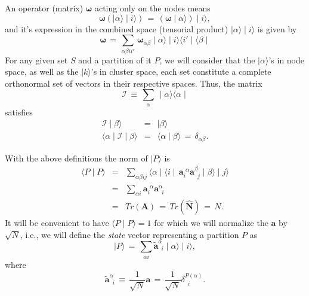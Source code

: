 \documentclass[twocolumn,aps,sort,nofootinbib]{revtex4}
\begin{document}
An operator (matrix) $\boldsymbol{\omega}$ acting only on the  nodes means
\begin{equation}
\boldsymbol{\omega}\left(\mid\alpha\rangle\mid i\rangle\right)\,=\,
\left(\boldsymbol{\omega}\mid\alpha\rangle\right)\mid i\rangle,
\end{equation}
and it's expression in the combined space (tensorial product) $\mid\alpha\rangle\mid i\rangle$
is given by
\begin{equation}
\boldsymbol{\omega}\,=\,\sum_{\alpha\beta ii'}\,\boldsymbol{\omega}_{\alpha\beta}\mid\alpha\rangle\mid i\rangle
\langle i'\mid\langle\beta\mid
\label{Operator}
\end{equation}
For any given set $S$ and a partition of it $P$, we will
consider that the $\mid\alpha\rangle$'s in node space, as well
as the $\mid k\rangle$'s in cluster space, each set constitute
a complete orthonormal set of vectors in their respective spaces.
Thus, the matrix
\begin{equation}
\mathcal{I}\,\equiv\,\sum_\alpha\,\mid\alpha\rangle\langle\alpha\mid
\label{Identity}
\end{equation} 
satisfies
\begin{eqnarray}
\mathcal{I}\mid\beta\rangle &=& \mid\beta\rangle \\
\langle\alpha\mid\mathcal{I}\mid\beta\rangle &=& \langle\alpha\mid\beta\rangle\,=\,\delta_{\alpha\beta}.
\end{eqnarray}

With the above definitions the norm of $\mid P\rangle$ is
\begin{eqnarray}
\langle P\mid P\rangle &=&\sum_{\alpha\beta ij}\langle\alpha\mid\langle i\mid\,
\mathbf{a}_i^{\phantom{i}\alpha}\mathbf{a}^\beta_{\phantom{a}j}\mid\beta\rangle\mid j\rangle \nonumber \\
&=&\sum_{\alpha i}\mathbf{a}_i^{\phantom{i}\alpha}\mathbf{a}^\alpha_{\phantom{a}i}\nonumber \\
&=&Tr\left(\mathbf{A}\right)\,=\,Tr\left(\mathbf{\hat{N}}\right)\,=\,N.
\end{eqnarray}
It will be convenient to have $\langle P\mid P\rangle=1$ for which we will normalize the $\mathbf{a}$ by
$\sqrt{N}$, i.e., we will define the {\sl state} vector representing a partition $P$ as
\begin{equation}
\mid P\rangle \,=\, \sum_{\alpha i}\mathbf{\tilde{a}}^\alpha_{\phantom{a}i}\mid\alpha\rangle\mid i\rangle,
\label{PartitionketNormalized}
\end{equation}
where
\begin{equation}
\mathbf{\tilde{a}}^\alpha_{\phantom{a}i}\,\equiv\,\frac{1}{\sqrt{N}}\mathbf{a}
\,=\,\frac{1}{\sqrt{N}}\delta^{P(\alpha)}_{\phantom{a}i}.
\end{equation}
\end{document}
